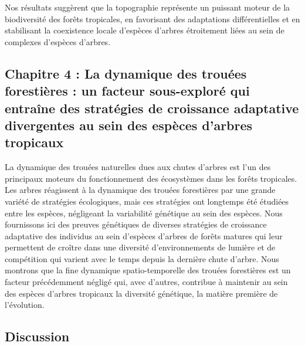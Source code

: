 \documentclass[12pt,twoside,a4paper, a]{article}
\begin{document}
Nos résultats suggèrent que la topographie représente un puissant moteur de la biodiversité des forêts tropicales, en favorisant des adaptations différentielles et en stabilisant la coexistence locale d'espèces d'arbres étroitement liées au sein de complexes d'espèces d'arbres.

\hypertarget{chapitre-4-la-dynamique-des-trouuxe9es-forestiuxe8res-un-facteur-sous-exploruxe9-qui-entrauxeene-des-stratuxe9gies-de-croissance-adaptative-divergentes-au-sein-des-espuxe8ces-darbres-tropicaux}{%
\subsection{Chapitre 4 : La dynamique des trouées forestières : un facteur sous-exploré qui entraîne des stratégies de croissance adaptative divergentes au sein des espèces d'arbres tropicaux}\label{chapitre-4-la-dynamique-des-trouuxe9es-forestiuxe8res-un-facteur-sous-exploruxe9-qui-entrauxeene-des-stratuxe9gies-de-croissance-adaptative-divergentes-au-sein-des-espuxe8ces-darbres-tropicaux}}

La dynamique des trouées naturelles dues aux chutes d'arbres est l'un des principaux moteurs du fonctionnement des écosystèmes dans les forêts tropicales. Les arbres réagissent à la dynamique des trouées forestières par une grande variété de stratégies écologiques, mais ces stratégies ont longtemps été étudiées entre les espèces, négligeant la variabilité génétique au sein des espèces. Nous fournissons ici des preuves génétiques de diverses stratégies de croissance adaptative des individus au sein d'espèces d'arbres de forêts matures qui leur permettent de croître dans une diversité d'environnements de lumière et de compétition qui varient avec le temps depuis la dernière chute d'arbre. Nous montrons que la fine dynamique spatio-temporelle des trouées forestières est un facteur précédemment négligé qui, avec d'autres, contribue à maintenir au sein des espèces d'arbres tropicaux la diversité génétique, la matière première de l'évolution.

\hypertarget{discussion}{%
\subsection{Discussion}\label{discussion}}
\end{document}
